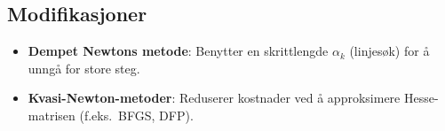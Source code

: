 \subsection{Modifikasjoner}
\begin{itemize}
  \item \textbf{Dempet Newtons metode}: Benytter en skrittlengde \(\alpha_k\) (linjesøk) for å unngå for store steg.
  \item \textbf{Kvasi-Newton-metoder}: Reduserer kostnader ved å approksimere Hesse-matrisen (f.eks.\ BFGS, DFP).
\end{itemize}
